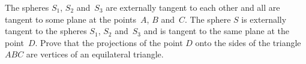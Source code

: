 \problem
The spheres $S_1$, $S_2$ and~$S_3$ are externally tangent to each other and all
are tangent to some plane at the points~$A$, $B$ and~$C$.
The sphere $S$ is externally tangent to the spheres $S_1$, $S_2$ and~$S_3$
and is tangent to the same plane at the point~$D$.
Prove that the projections of the point $D$ onto the sides of
the triangle $ABC$ are vertices of an equilateral triangle.
\solution
\endproblem
